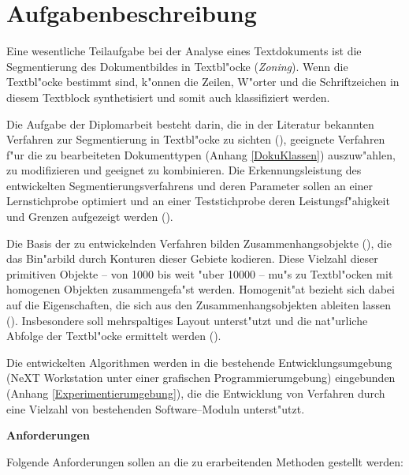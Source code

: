\chapter{Aufgabenbeschreibung}

Eine wesentliche Teilaufgabe bei der Analyse eines Textdokuments ist die Segmentierung
des Dokumentbildes in Textbl"ocke ({\em Zoning\/}). Wenn die Textbl"ocke bestimmt sind, k"onnen
die Zeilen, W"orter und die Schriftzeichen in diesem Textblock synthetisiert und somit
auch klassifiziert werden.

Die Aufgabe der Diplomarbeit besteht darin, die in der Literatur bekannten Verfahren
zur Segmentierung in Textbl"ocke zu sichten (), geeignete
Verfahren f"ur die zu bearbeiteten Dokumenttypen (Anhang \ref{DokuKlassen}) 
auszuw"ahlen, zu modifizieren und geeignet zu kombinieren.
Die Erkennungsleistung des entwickelten Segmentierungsverfahrens und deren Parameter
sollen an einer Lernstichprobe optimiert und an einer Teststichprobe deren Leistungsf"ahigkeit
und Grenzen aufgezeigt werden ().

Die Basis der zu entwickelnden Verfahren bilden Zu\-sammen\-hangs\-objekte
(), die das Bin"arbild durch Konturen dieser Gebiete kodieren.
Diese Vielzahl dieser primitiven Objekte -- von 1000 bis weit "uber 10000 -- mu"s
zu Textbl"ocken mit homogenen Objekten zusammengefa"st werden. Homogenit"at bezieht
sich dabei auf die Eigenschaften, die sich aus den Zusammenhangsobjekten ableiten
lassen (). Insbesondere soll mehrspaltiges Layout unterst"utzt und die
nat"urliche Abfolge der Textbl"ocke ermittelt werden (). 

Die entwickelten Algorithmen werden in die bestehende Entwicklungsumgebung
(NeXT Workstation unter einer grafischen Programmierumgebung) eingebunden 
(Anhang \ref{Experimentierumgebung}),
die die Entwicklung von Verfahren durch eine Vielzahl von bestehenden Software--Moduln unterst"utzt.

\newpage
{\large \bf Anforderungen}\label{Anforderungen}

Folgende Anforderungen sollen an die zu erarbeitenden Methoden gestellt werden:

